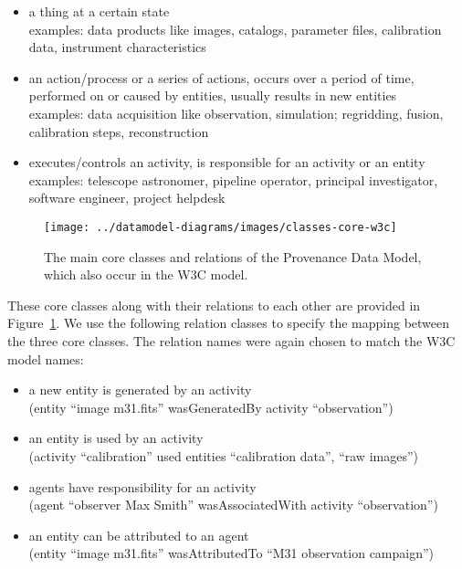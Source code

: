 \begin{itemize}
\item {} a thing at a certain state\\
    examples: data products like images, catalogs, parameter files, calibration data, instrument characteristics

\item {} an action/process or a series of actions, occurs over a period of time, performed on or caused by entities, usually results in new entities\\
    examples: data acquisition like observation, simulation; regridding, fusion, calibration steps, reconstruction

\item {} executes/controls an activity, is responsible for an activity or an entity\\
    examples: telescope astronomer, pipeline operator, principal investigator, software engineer, project helpdesk

\end{itemize}

\noindent



\begin{figure}[h]
\centering
\texttt{[image: ../datamodel-diagrams/images/classes-core-w3c]}
\caption{The main core classes and relations of the Provenance Data Model, which also occur in the W3C model.}
\label{fig:coreclasses}
\end{figure}

These core classes along with their relations to each other are provided in Figure~\ref{fig:coreclasses}.
We use the following relation classes to specify the mapping between the three core 
classes. 
The relation names were again chosen to match the W3C model names:
\begin{itemize}
\item {} a new entity is generated by an activity\\
        (entity ``image m31.fits'' wasGeneratedBy activity ``observation'')
\item {} an entity is used by an activity\\
        (activity ``calibration'' used entities ``calibration data'', ``raw images'')
\item {} agents have responsibility for an activity\\
        (agent ``observer Max Smith'' wasAssociatedWith activity ``observation'')
\item {} an entity can be attributed to an agent\\
        (entity ``image m31.fits'' wasAttributedTo ``M31 observation campaign'')
\end{itemize}

